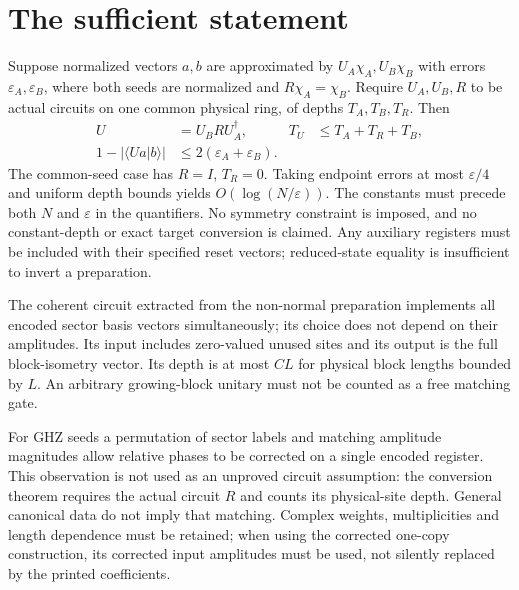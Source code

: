 \documentclass{article}
\begin{document}
\section{The sufficient statement}
Suppose normalized vectors $a,b$ are approximated by $U_A\chi_A,U_B\chi_B$
with errors $\varepsilon_A,\varepsilon_B$, where both seeds are normalized
and $R\chi_A=\chi_B$. Require $U_A,U_B,R$ to be actual circuits on one
common physical ring, of depths $T_A,T_B,T_R$. Then
\begin{align}
    U                       & =U_BRU_A^\dagger,                   & T_U & \leq T_A+T_R+T_B, \\
    1-|\langle Ua|b\rangle| & \leq2(\varepsilon_A+\varepsilon_B).
\end{align}
The common-seed case has $R=I$, $T_R=0$. Taking endpoint errors at most
$\varepsilon/4$ and uniform depth bounds yields $O(\log(N/\varepsilon))$.
The constants must precede both $N$ and $\varepsilon$ in the quantifiers.
No symmetry constraint is imposed, and no constant-depth or exact target
conversion is claimed. Any auxiliary registers must be included with their
specified reset vectors; reduced-state equality is insufficient to invert
a preparation.

The coherent circuit extracted from the non-normal preparation implements
all encoded sector basis vectors simultaneously; its choice does not depend
on their amplitudes. Its input includes zero-valued unused sites and its
output is the full block-isometry vector. Its depth is at most $CL$ for
physical block lengths bounded by $L$. An arbitrary growing-block unitary
must not be counted as a free matching gate.

For GHZ seeds a permutation of sector labels and matching amplitude
magnitudes allow relative phases to be corrected on a single encoded
register. This observation is not used as an unproved circuit assumption:
the conversion theorem requires the actual circuit $R$ and counts its
physical-site depth. General canonical data do not imply that matching.
Complex weights, multiplicities and length dependence must be retained;
when using the corrected one-copy construction, its corrected input
amplitudes must be used, not silently replaced by the printed coefficients.



\end{document}
